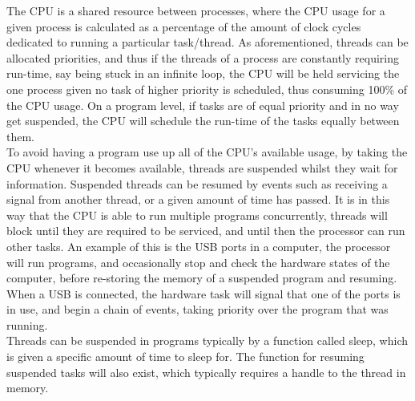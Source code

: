 \documentclass[12pt,openany,a4paper]{book}
\begin{document}
The CPU is a shared resource between processes, where the CPU usage for a given process is calculated as a percentage of the amount of clock cycles dedicated to running a particular task/thread. As aforementioned, threads can be allocated priorities, and thus if the threads of a process are constantly requiring run-time, say being stuck in an infinite loop, the CPU will be held servicing the one process given no task of higher priority is scheduled, thus consuming 100\% of the CPU usage. On a program level, if tasks are of equal priority and in no way get suspended, the CPU will schedule the run-time of the tasks equally between them.\\
To avoid having a program use up all of the CPU's available usage, by taking the CPU whenever it becomes available, threads are suspended whilst they wait for information. Suspended threads can be resumed by events such as receiving a signal from another thread, or a given amount of time has passed. It is in this way that the CPU is able to run multiple programs concurrently, threads will block until they are required to be serviced, and until then the processor can run other tasks. An example of this is the USB ports in a computer, the processor will run programs, and occasionally stop and check the hardware states of the computer, before re-storing the memory of a suspended program and resuming. When a USB is connected, the hardware task will signal that one of the ports is in use, and begin a chain of events, taking priority over the program that was running. \\
Threads can be suspended in programs typically by a function called sleep, which is given a specific amount of time to sleep for. The function for resuming suspended tasks will also exist, which typically requires a handle to the thread in memory.\\
\end{document}
